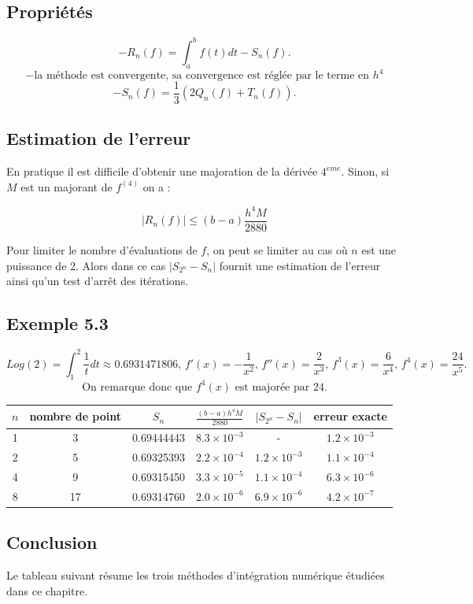 \subsection{Propriétés}
\[
- R_n(f) = \displaystyle\int_a^b f(t)dt - S_n(f).
\]
\[
- \text{la méthode est convergente, sa convergence est réglée par le terme en } h^4
\]
\[
- S_n(f) = \frac{1}{3}(2Q_n(f) + T_n(f)).
\]

\subsection{Estimation de l'erreur}
En pratique il est difficile d'obtenir une majoration de la dérivée \( 4^{eme} \). Sinon, si \( M \) est un majorant de \( f^{(4)} \) on a :

\[
|R_n(f)| \leq (b - a) \frac{h^4 M}{2880}
\]

Pour limiter le nombre d'évaluations de \( f \), on peut se limiter au cas où \( n \) est une puissance de 2. Alors dans ce cas \( |S_{2^n} - S_n| \) fournit une estimation de l'erreur ainsi qu'un test d'arrêt des itérations.

\subsection{Exemple 5.3}
\[
Log(2) = \displaystyle\int_1^2 \frac{1}{t} dt \approx 0.6931471806, \, f'(x) = -\frac{1}{x^2}, \, f''(x) = \frac{2}{x^3}, \, f^3(x) = \frac{6}{x^4}, \, f^4(x) = \frac{24}{x^5}.
\]
\[\text{On remarque donc que } f^4(x) \text{ est majorée par 24.}\]

\begin{table}[H]
	\centering
	\begin{tabular}{cccccc}
		\(n\) & nombre de point & \(S_n\) & \(\frac{(b-a)h^4 M}{2880}\) & \(|S_{2^n} - S_n|\) & erreur exacte \\
		\hline
		1 & 3 & 0.69444443 & \(8.3\times10^{-3}\) & - & \(1.2\times10^{-3}\) \\
		2 & 5 & 0.69325393 & \(2.2\times10^{-4}\) & \(1.2\times10^{-3}\) & \(1.1\times10^{-4}\) \\
		4 & 9 & 0.69315450 & \(3.3\times10^{-5}\) & \(1.1\times10^{-4}\) & \(6.3\times10^{-6}\) \\
		8 & 17 & 0.69314760 & \(2.0\times10^{-6}\) & \(6.9\times10^{-6}\) & \(4.2\times10^{-7}\) \\
	\end{tabular}
\end{table}

\subsection{Conclusion}
Le tableau suivant résume les trois méthodes d'intégration numérique étudiées dans ce chapitre.

